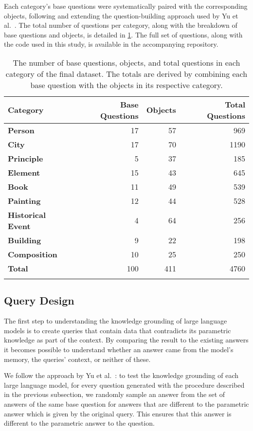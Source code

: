 Each category's base questions were systematically paired with the corresponding objects, following and extending the question-building approach used by Yu et al.~\cite{factual_recall}.
The total number of questions per category, along with the breakdown of base questions and objects, is detailed in \cref{category_amounts}.
The full set of questions, along with the code used in this study, is available in the accompanying repository.

\begin{table}[t]
	\centering
	\footnotesize
	\begin{tabular}{>{\bfseries}l r r r}
		\toprule
			\bfseries Category & \bfseries Base Questions & \bfseries Objects & \bfseries Total Questions \\
		\midrule
			Person & 17 & 57 & 969 \\
			City & 17 & 70 & 1190 \\
			Principle & 5 & 37 & 185 \\
			Element & 15 & 43 & 645 \\
			Book & 11 & 49 & 539 \\
			Painting & 12 & 44 & 528 \\
			Historical Event & 4 & 64 & 256 \\
			Building & 9 & 22 & 198 \\
			Composition & 10 & 25 & 250 \\
		\midrule
			Total & 100 & 411 & 4760 \\
		\bottomrule \addlinespace[4pt]
	\end{tabular}
	\caption{The number of base questions, objects, and total questions in each category of the final dataset. The totals are derived by combining each base question with the objects in its respective category.}
	\label{category_amounts}
\end{table}

\subsection{Query Design}
\label{query_design}

The first step to understanding the knowledge grounding of large language models is to create queries that contain data that contradicts its parametric knowledge as part of the context.
By comparing the result to the existing answers it becomes possible to understand whether an answer came from the model's memory, the queries' context, or neither of these.

We follow the approach by Yu et al.~\cite{factual_recall}: to test the knowledge grounding of each large language model, for every question generated with the procedure described in the previous subsection, we randomly sample an answer from the set of answers of the same base question for answers that are different to the parametric answer which is given by the original query.
This ensures that this answer is different to the parametric answer to the question.

